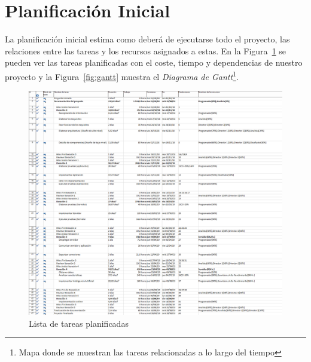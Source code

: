 \section{Planificación Inicial}

La planificación inicial estima como deberá de ejecutarse todo el proyecto, las relaciones entre las tareas y los recursos asignados a estas. En la Figura~\ref{fig:tareas} se pueden ver las tareas planificadas con el coste, tiempo y dependencias de nuestro proyecto y la Figura~\ref{fig:gantt} muestra el \textit{Diagrama de Gantt}\footnote{Mapa donde se muestran las tareas relacionadas a lo largo del tiempo}.


\begin{landscape}

    \begin{figure}
            \includegraphics[width=\linewidth, height=0.9\textheight]{imaxes/project/tareas.png}
        \centering
        \caption{Lista de tareas planificadas}
        \label{fig:tareas}
    \end{figure}


\end{landscape}
